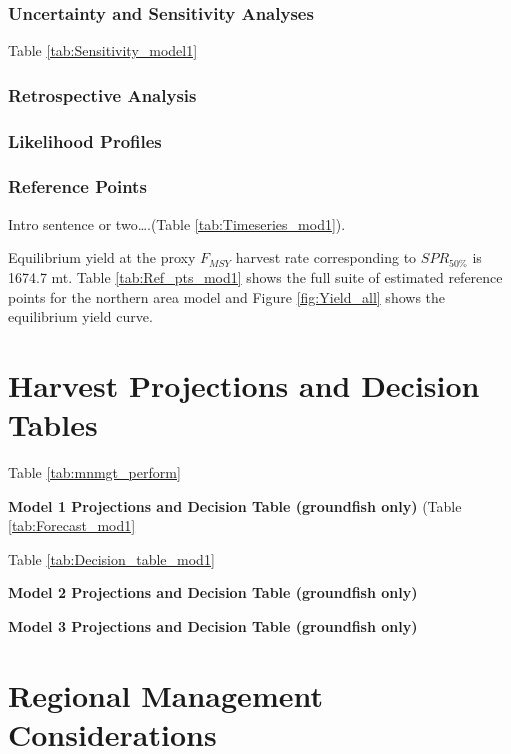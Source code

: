 \documentclass[12pt,]{article}
\begin{document}
\subsubsection{Uncertainty and Sensitivity
Analyses}\label{uncertainty-and-sensitivity-analyses}

Table \ref{tab:Sensitivity_model1}

\subsubsection{Retrospective Analysis}\label{retrospective-analysis}

\subsubsection{Likelihood Profiles}\label{likelihood-profiles}

\subsubsection{Reference Points}\label{reference-points-1}

Intro sentence or two\ldots{}.(Table \ref{tab:Timeseries_mod1}).

Equilibrium yield at the proxy \(F_{MSY}\) harvest rate corresponding to
\(SPR_{50\%}\) is 1674.7 mt. Table \ref{tab:Ref_pts_mod1} shows the full
suite of estimated reference points for the northern area model and
Figure \ref{fig:Yield_all} shows the equilibrium yield curve.

\section{Harvest Projections and Decision
Tables}\label{harvest-projections-and-decision-tables}

Table \ref{tab:mnmgt_perform}

\textbf{Model 1 Projections and Decision Table (groundfish only)} (Table
\ref{tab:Forecast_mod1}

Table \ref{tab:Decision_table_mod1}

\textbf{Model 2 Projections and Decision Table (groundfish only)}

\textbf{Model 3 Projections and Decision Table (groundfish only)}

\section{Regional Management
Considerations}\label{regional-management-considerations}
\end{document}
